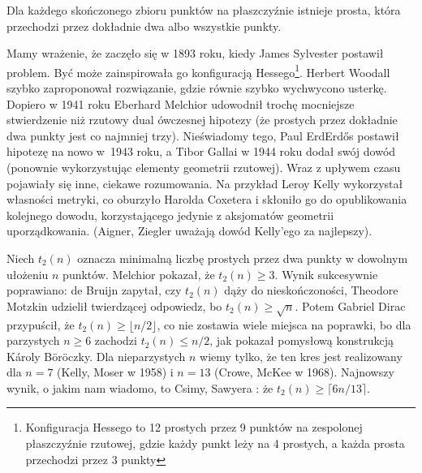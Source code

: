 \begin{theorem}
	Dla każdego skończonego zbioru punktów na płaszczyźnie istnieje prosta, która przechodzi przez dokładnie dwa albo wszystkie punkty.
\end{theorem}

Mamy wrażenie, że zaczęło się w 1893 roku, kiedy James Sylvester postawił problem.
Być może zainspirowała go konfiguracją Hessego\footnote{Konfiguracja Hessego to 12 prostych przez 9 punktów na zespolonej płaszczyźnie rzutowej, gdzie każdy punkt leży na 4 prostych, a każda prosta przechodzi przez 3 punkty}.
Herbert Woodall szybko zaproponował rozwiązanie, gdzie równie szybko wychwycono usterkę.
Dopiero w 1941 roku Eberhard Melchior udowodnił trochę mocniejsze stwierdzenie niż rzutowy dual ówczesnej hipotezy (że prostych przez dokładnie dwa punkty jest co najmniej trzy).
Nieświadomy tego, Paul ErdErdős postawił hipotezę na nowo w~1943 roku, a Tibor Gallai w 1944 roku dodał swój dowód (ponownie wykorzystując elementy geometrii rzutowej).
Wraz z upływem czasu pojawiały się inne, ciekawe rozumowania.
Na przykład Leroy Kelly wykorzystał własności metryki, co oburzyło Harolda Coxetera i skłoniło go do opublikowania kolejnego dowodu, korzystającego jedynie z aksjomatów geometrii uporządkowania.
(Aigner, Ziegler uważają dowód Kelly'ego za najlepszy).

Niech $t_2(n)$ oznacza minimalną liczbę prostych przez dwa punkty w dowolnym ułożeniu $n$ punktów.
Melchior pokazał, że $t_2(n) \ge 3$.
Wynik sukcesywnie poprawiano:
de Bruijn \cite{debruijn_1948} zapytał, czy $t_2(n)$ dąży do nieskończoności,
Theodore Motzkin \cite{motzkin_1951} udzielił twierdzącej odpowiedz, bo $t_2(n) \ge \sqrt{n}$.
Potem Gabriel Dirac \cite{dirac_1951} przypuścił, że $t_2(n) \ge \lfloor n/2\rfloor$, co nie zostawia wiele miejsca na poprawki, bo dla parzystych $n \ge 6$ zachodzi $t_2(n) \le n/2$, jak pokazał pomysłową konstrukcją Károly Böröczky.
Dla nieparzystych $n$ wiemy tylko, że ten kres jest realizowany dla $n = 7$ (Kelly, Moser \cite{kelly_1958} w 1958) i $n = 13$ (Crowe, McKee \cite{mckee_1968} w 1968).
Najnowszy wynik, o jakim nam wiadomo, to Csimy, Sawyera \cite{csima_1993}: że $t_2(n) \ge \lceil 6n/13 \rceil$.